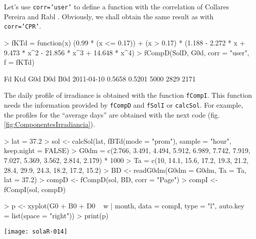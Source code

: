 \documentclass[oldfontcommands,a4paper]{memoir}
\makeatletter
\renewenvironment{figure}[1][]{%
     	\@float{figure}%
		\precaption{\rule{\linewidth}{0.4pt}\par}%
		\centering
		  }{%
    	\end@float	
}
\renewenvironment{Schunk}{\vspace{\topsep}}{\vspace{\topsep}}
\makeatother
\begin{document}
Let's use \texttt{corr='user'} to define a function with the
correlation of Collares Pereira and Rabl \cite{Collares-Pereira.Rabl1979}. 
Obviously, we shall obtain the same result as with \texttt{corr='CPR'}.

\begin{Schunk}
\begin{Sinput}
> fKTd = function(x) {
     (0.99 * (x <= 0.17)) + (x > 0.17) * (1.188 - 2.272 * x + 
         9.473 * x^2 - 21.856 * x^3 + 14.648 * x^4)
 }
> fCompD(SolD, G0d, corr = "user", f = fKTd)
\end{Sinput}
\begin{Soutput}
               Fd    Ktd  G0d  D0d  B0d
2011-04-10 0.5658 0.5201 5000 2829 2171
\end{Soutput}
\end{Schunk}
                      
The daily profile of irradiance is obtained with the function \texttt{fCompI}. 
This function needs the information provided by \texttt{fCompD} and \texttt{fSolI} or \texttt{calcSol}. For example, the profiles for the ``average days'' are obtained with the next code (fig. \ref{fig:ComponentesIrradiancia}).

\begin{Schunk}
\begin{Sinput}
> lat = 37.2
> sol <- calcSol(lat, fBTd(mode = "prom"), sample = "hour", keep.night = FALSE)
> G0dm = c(2.766, 3.491, 4.494, 5.912, 6.989, 7.742, 7.919, 7.027, 
     5.369, 3.562, 2.814, 2.179) * 1000
> Ta = c(10, 14.1, 15.6, 17.2, 19.3, 21.2, 28.4, 29.9, 24.3, 18.2, 
     17.2, 15.2)
> BD <- readG0dm(G0dm = G0dm, Ta = Ta, lat = 37.2)
> compD <- fCompD(sol, BD, corr = "Page")
> compI <- fCompI(sol, compD)
\end{Sinput}
\end{Schunk}

%
\begin{figure}
\begin{centering}
\begin{Schunk}
\begin{Sinput}
> p <- xyplot(G0 + B0 + D0 ~ w | month, data = compI, type = "l", 
     auto.key = list(space = "right"))
> print(p)
\end{Sinput}
\end{Schunk}
\texttt{[image: solaR-014]}
\par\end{centering}
\caption{Global, diffuse, and direct irradiance during the ``average days''.\label{fig:ComponentesIrradiancia}}
\end{figure}
\end{document}
